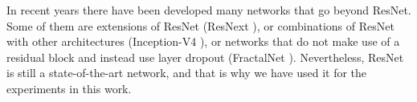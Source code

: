 In recent years there have been developed many networks that go beyond ResNet. Some of them are extensions of ResNet (ResNext \parencite{xie2016}), or combinations of ResNet with other architectures (Inception-V4 \parencite{szegedy2016}), or  networks that do not make use of a residual block and instead use layer dropout (FractalNet \parencite{larsson2016}). Nevertheless, ResNet is still a state-of-the-art network, and that is why we have used it for the experiments in this work.
